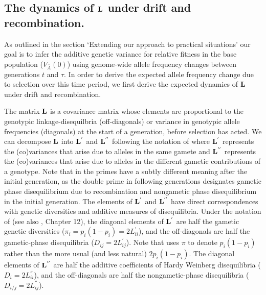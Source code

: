 \documentclass[12pt]{article}
\begin{document}
\begin{bibunit}

\setcounter{equation}{0}
    \renewcommand{\theequation}{S\arabic{equation}}
    \setcounter{figure}{0}
    \renewcommand{\thefigure}{Supplementary Figure \arabic{figure}}
    \setcounter{section}{0}
    \renewcommand{\thesection}{S\arabic{section}}

    
\section{The dynamics of ${\bf L}$ under drift and recombination.} \label{Appendix:LD}
As outlined in the section `Extending our approach to practical situations' our goal is to infer the additive genetic variance for relative fitness in the base population ($V_{\bar A}(0)$) using genome-wide allele frequency changes between generations $t$ and $\tau$. In order to derive the expected allele frequency change due to selection over this time period, we first derive the expected dynamics of $\bf L$ under drift and recombination.

The matrix ${\bf L}$ is a covariance matrix whose elements are proportional to the genotypic linkage-disequilbria (off-diagonals) or variance in genotypic allele frequencies (diagonals) at the start of a generation, before selection has acted. We can decompose  ${\bf L}$ into ${\bf L}^{'}$ and ${\bf L}^{''}$ following the notation of \citet{buffalo2019linked} where ${\bf L}^{'}$ represents the (co)variances that arise due to alleles in the same gamete and ${\bf L}^{''}$ represents the (co)variances that arise due to alleles in the different gametic contributions of a genotype. Note that in \citet{Santiago.1998} the primes have a subtly different meaning after the initial generation, as the double prime in following generations designates gametic phase disequilibrium due to recombination and nongametic phase disequilibrium in the initial generation. The elements of ${\bf L}^{'}$ and ${\bf L}^{''}$ have direct correspondences with genetic diversities and additive measures of disequilibria. Under the notation of \citet{Weir.1989} (see also \citet{bulmer1980mathematical}, Chapter 12), the diagonal elements of ${\bf L}^{'}$ are half the gametic genetic diversities ($\pi_i=p_i(1-p_i)=2L^{'}_{ii}$), and the off-diagonals are half the gametic-phase disequilibria ($D_{ij}=2L^{'}_{ij}$). Note that \citet{Weir.1989} uses $\pi$ to denote $p_i(1-p_i)$ rather than the more usual (and less natural) $2p_i(1-p_i)$. The diagonal elements of ${\bf L}^{''}$ are half the additive coefficients of Hardy Weinberg disequilibria ($D_{i}=2L^{''}_{ii}$), and the off-diagonals are half the nongametic-phase disequilibria ($D_{i/j}=2L^{''}_{ij}$). 


\end{bibunit}
\end{document}

